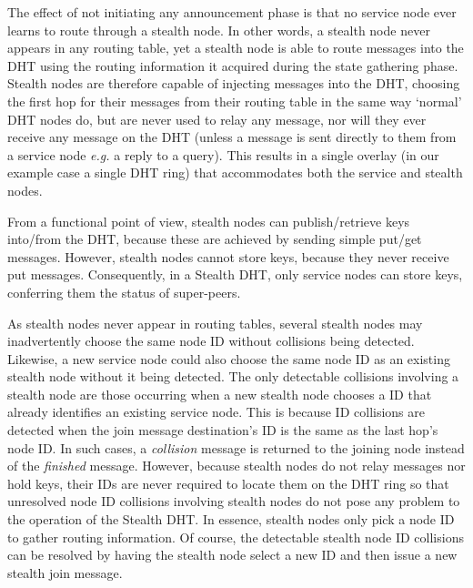 \documentclass[letterpaper]{sig-alternate} %
\begin{document}
The effect of not initiating any announcement phase is that no service
node ever learns to route through a stealth node. In other words, a
stealth node never appears in any routing table, yet a stealth node is
able to route messages into the DHT using the routing information it
acquired during the state gathering phase. Stealth nodes are therefore
capable of injecting messages into the DHT, choosing the first hop for
their messages from their routing table in the same way `normal' DHT
nodes do, but are never used to relay any message, nor will they ever
receive any message on the DHT (unless a message is sent directly to
them from a service node \emph{e.g.} a reply to a query). This results
in a single overlay (in our example case a single DHT ring) that
accommodates both the service and stealth nodes.


From a functional point of view, stealth nodes can publish/retrieve keys
into/from the DHT, because these are achieved by sending simple put/get
messages. However, stealth nodes cannot store keys, because they never receive
put messages. Consequently, in a Stealth DHT, only service nodes can store
keys, conferring them the status of super-peers.

As stealth nodes never appear in routing tables, several stealth nodes may
inadvertently choose the same node ID without collisions being detected.
Likewise, a new service node could also choose the same node ID as an existing
stealth node without it being detected. The only detectable collisions
involving a stealth node are those occurring when a new stealth node chooses a
ID that already identifies an existing service node. This is because ID
collisions are detected when the join message destination's ID is the same as
the last hop's node ID. In such cases, a \emph{collision} message is returned
to the joining node instead of the \emph{finished} message. However, because
stealth nodes do not relay messages nor hold keys, their IDs are never required
to locate them on the DHT ring so that unresolved node ID collisions involving
stealth nodes do not pose any problem to the operation of the Stealth DHT. In
essence, stealth nodes only pick a node ID to gather routing information. Of
course, the detectable stealth node ID collisions can be resolved by having the
stealth node select a new ID and then issue a new stealth join message.
\end{document}
